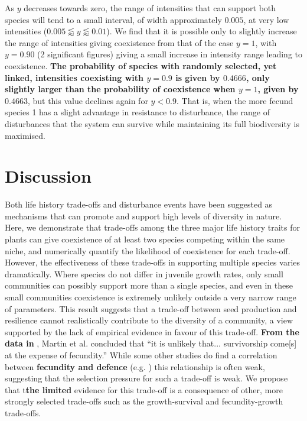 \documentclass[preprint,10pt,reqno]{report}
\begin{document}
As $y$ decreases towards zero, the range of intensities that can support both species will tend to a small interval, of width approximately $0.005$, at very low intensities ($0.005\lessapprox y \lessapprox 0.01$). We find that it is possible only to slightly increase the range of intensities giving coexistence from that of the case $y=1$, with $y=0.90$ (2 significant figures) giving a small increase in intensity range leading to coexistence. \textbf{The probability of species with randomly selected, yet linked, intensities coexisting with $y=0.9$ is given by $0.4666$, only slightly larger than the probability of coexistence when $y=1$, given by $0.4663$}, but this value declines again for $y<0.9$. That is, when the more fecund species 1 has a slight advantage in resistance to disturbance, the range of disturbances that the system can survive while maintaining its full biodiversity is maximised.

\section{Discussion}
Both life history trade-offs and disturbance events have been suggested as mechanisms that can promote and support high levels of diversity in nature. Here, we demonstrate that trade-offs among the three major life history traits for plants can give coexistence of at least two species competing within the same niche, and numerically quantify the likelihood of coexistence for each trade-off. However, the effectiveness of these trade-offs in supporting multiple species varies dramatically. Where species do not differ in juvenile growth rates, only small communities can possibly support more than a single species, and even in these small communities coexistence is extremely unlikely outside a very narrow range of parameters. This result suggests that a trade-off between seed production and resilience cannot realistically contribute to the diversity of a community, a view supported by the lack of empirical evidence in favour of this trade-off. \textbf{From the data in} \cite{martin2010dispersal}, Martin et al. \cite{martin2010divergence} concluded that ``it is unlikely that... survivorship come[s] at the expense of fecundity.'' While some other studies do find a correlation between \textbf{fecundity and defence} (e.g. \cite{marquis1984leaf,gwynn2005resistance}) this relationship is often weak, suggesting that the selection pressure for such a trade-off is weak. We propose that t\textbf{the limited} evidence for this trade-off is a consequence of other, more strongly selected trade-offs such as the growth-survival and fecundity-growth trade-offs.
\end{document}
